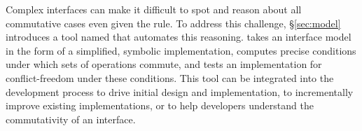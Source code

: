 \begin{comment}
Applying the rule to real-world software systems poses two challenges.
%
First, the usual definition of commutativity is limited in ways that
restricts its applicability to complex, stateful interfaces.  To
address this challenge, \S\ref{sec:rule} defines a novel form of
commutativity named \emph{\SRI\ commutativity}.
%
\SRI commutativity is \emph{state-dependent}: rather than requiring
operations to be order-invariant in all states, \SRI\ commutativity
allows developers to reason not only about specific arguments for
which operations commute, but also in which system states they
commute, exposing more opportunities to apply the rule.  The above
example from POSIX shows why this is important: creating files with
different names does \emph{not} commute if the names are symlinks to
the same name, but this one case does not limit the rule's
applicability to other file system states.
%
\SRI\ commutativity is \emph{region-oriented}: rather than applying to just
two operations, \SRI\ commutativity applies to a region of an execution
trace, which may contain several operations, again exposing more
opportunities to apply the rule.
%
Finally, it is \emph{interface-based}: rather than requiring all
operation orders to produce identical internal states, it requires the
resulting states to be indistinguishable via the interface, allowing
developers to reason about commutativity independent of any specific
implementation.

\XXX[AC][Spread the above new terminology to the rest of the paper.]
\end{comment}

Complex interfaces can make it difficult to spot and reason about all
commutative cases even given the rule.  To address this challenge,
\S\ref{sec:model} introduces a tool named \tool that automates this
reasoning.  \tool takes an interface model
in the form of a simplified, symbolic implementation, computes precise
conditions under which sets of operations commute, and tests an
implementation for conflict-freedom under these conditions.  This tool can be
integrated into the development process to drive initial design and
implementation, to incrementally improve existing implementations, or to
help developers understand the commutativity of an interface.
%
\cbend

